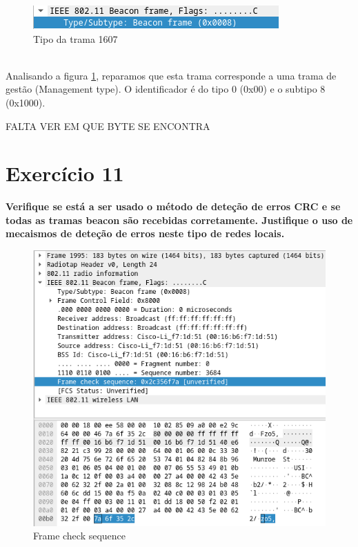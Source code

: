 \documentclass[a4paper]{report}
\begin{document}
\begin{figure}[H]
    \centering 
    \includegraphics[width=\textwidth]{images/tipoEx10.png}  
    \caption{Tipo da trama 1607}
    \label{fig:tipoEx10}
\end{figure}\\

Analisando a figura \ref{fig:tipoEx10}, reparamos que esta trama corresponde a
uma trama de gestão (Management type). O identificador é do tipo 0 (0x00) e o
subtipo 8 (0x1000).

FALTA VER EM QUE BYTE SE ENCONTRA

\section{Exercício 11}
\textbf{Verifique se está a ser usado o método de deteção de erros CRC e se
    todas as tramas beacon são recebidas corretamente. Justifique o uso de
    mecaismos de deteção de erros neste tipo de redes locais.}\\

\begin{figure}[H]
    \centering 
    \includegraphics[width=\textwidth]{images/erroEx11.png}  
    \caption{Frame check sequence}
    \label{fig:erroEx11}
\end{figure}\\
\end{document}
